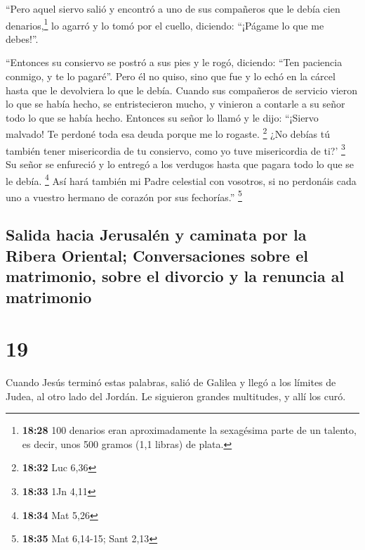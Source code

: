  ``Pero aquel siervo salió y encontró a uno de sus
compañeros que le debía cien denarios,\footnote{\textbf{18:28} 100
  denarios eran aproximadamente la sexagésima parte de un talento, es
  decir, unos 500 gramos (1,1 libras) de plata.} lo agarró y lo tomó por
el cuello, diciendo: ``¡Págame lo que me debes!''.

 ``Entonces su consiervo se postró a sus pies y le rogó,
diciendo: ``Ten paciencia conmigo, y te lo pagaré''. 
Pero él no quiso, sino que fue y lo echó en la cárcel hasta que le
devolviera lo que le debía.  Cuando sus compañeros de
servicio vieron lo que se había hecho, se entristecieron mucho, y
vinieron a contarle a su señor todo lo que se había hecho.
 Entonces su señor lo llamó y le dijo: ``¡Siervo malvado!
Te perdoné toda esa deuda porque me lo rogaste. \footnote{\textbf{18:32}
  Luc 6,36}  ¿No debías tú también tener misericordia de
tu consiervo, como yo tuve misericordia de ti?' \footnote{\textbf{18:33}
  1Jn 4,11}  Su señor se enfureció y lo entregó a los
verdugos hasta que pagara todo lo que se le debía. \footnote{\textbf{18:34}
  Mat 5,26}  Así hará también mi Padre celestial con
vosotros, si no perdonáis cada uno a vuestro hermano de corazón por sus
fechorías.'' \footnote{\textbf{18:35} Mat 6,14-15; Sant 2,13}

\hypertarget{salida-hacia-jerusaluxe9n-y-caminata-por-la-ribera-oriental-conversaciones-sobre-el-matrimonio-sobre-el-divorcio-y-la-renuncia-al-matrimonio}{%
\subsection{Salida hacia Jerusalén y caminata por la Ribera Oriental;
Conversaciones sobre el matrimonio, sobre el divorcio y la renuncia al
matrimonio}\label{salida-hacia-jerusaluxe9n-y-caminata-por-la-ribera-oriental-conversaciones-sobre-el-matrimonio-sobre-el-divorcio-y-la-renuncia-al-matrimonio}}

\hypertarget{section-18}{%
\section{19}\label{section-18}}

 Cuando Jesús terminó estas palabras, salió de Galilea y
llegó a los límites de Judea, al otro lado del Jordán.  Le
siguieron grandes multitudes, y allí los curó.

